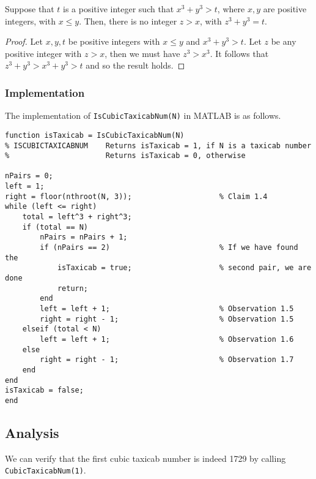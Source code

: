 \begin{observation}
	Suppose that $t$ is a positive integer such that $x^3 + y^3 > t$, where $x, y$ are positive integers, with $x \leq y$. Then, there is no integer $z > x$, with $z^3 + y^3 = t$.
\end{observation}
\begin{proof}
	Let $x, y, t$ be positive integers with $x \leq y$ and $x^3 + y^3 > t$. Let $z$ be any positive integer with $z > x$, then we must have $z^3 > x^3$. It follows that $z^3 + y^3 > x^3 + y^3 > t$ and so the result holds.
\end{proof}

\newpage
\subsubsection{Implementation}
The implementation of \lstinline|IsCubicTaxicabNum(N)| in MATLAB is as follows.

\begin{lstlisting}
function isTaxicab = IsCubicTaxicabNum(N)
% ISCUBICTAXICABNUM    Returns isTaxicab = 1, if N is a taxicab number
%                      Returns isTaxicab = 0, otherwise

nPairs = 0;
left = 1;
right = floor(nthroot(N, 3));                    % Claim 1.4
while (left <= right)
    total = left^3 + right^3;
    if (total == N)
        nPairs = nPairs + 1;
        if (nPairs == 2)                         % If we have found the
            isTaxicab = true;                    % second pair, we are done
            return;
        end
        left = left + 1;                         % Observation 1.5
        right = right - 1;                       % Observation 1.5
    elseif (total < N)
        left = left + 1;                         % Observation 1.6
    else
        right = right - 1;                       % Observation 1.7
    end
end
isTaxicab = false;
end
\end{lstlisting}


\subsection{Analysis}

\begin{example}
	We can verify that the first cubic taxicab number is indeed 1729 by calling \lstinline|CubicTaxicabNum(1)|.
\end{example}

